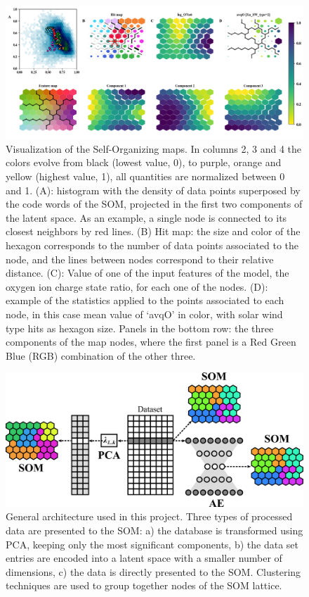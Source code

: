 \documentclass[utf8]{frontiersSCNS} %
\begin{document}
\begin{figure}[h!]
	\begin{center}
		\includegraphics[width=16cm]{Amaya/maps}%
	\end{center}
	\caption{Visualization of the Self-Organizing maps. In columns 2, 3 and 4 the colors evolve from black (lowest value, 0), to purple, orange and yellow (highest value, 1), all quantities are normalized between 0 and 1. (A): histogram with the density of data points superposed by the code words of the SOM, projected in the first two components of the latent space. As an example, a single node is connected to its closest neighbors by red lines. (B) Hit map: the size and color of the hexagon corresponds to the number of data points associated to the node, and the lines between nodes correspond to their relative distance. (C): Value of one of the input features of the model, the oxygen ion charge state ratio, for each one of the nodes. (D): example of the statistics applied to the points associated to each node, in this case mean value of `avqO' in color, with solar wind type hits as hexagon size. Panels in the bottom row: the three components of the map nodes, where the first panel is a Red Green Blue (RGB) combination of the other three.}\label{fig:maps}
\end{figure}

\begin{figure}[h!]
	\begin{center}
		\includegraphics[width=12cm]{architecture}%
	\end{center}
	\caption{General architecture used in this project. Three types of processed data are presented to the SOM: a) the database is transformed using PCA, keeping only the most significant components, b) the data set entries are encoded into a latent space with a smaller number of dimensions, c) the data is directly presented to the SOM. Clustering techniques are used to group together nodes of the SOM lattice.}\label{fig:architecture}
\end{figure}
\end{document}
